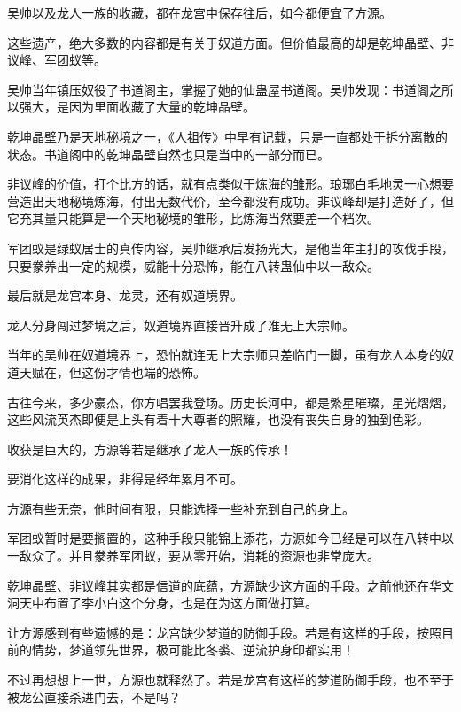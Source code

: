 \begin{this_body}
吴帅以及龙人一族的收藏，都在龙宫中保存往后，如今都便宜了方源。

这些遗产，绝大多数的内容都是有关于奴道方面。但价值最高的却是乾坤晶壁、非议峰、军团蚁等。

吴帅当年镇压奴役了书道阁主，掌握了她的仙蛊屋书道阁。吴帅发现：书道阁之所以强大，是因为里面收藏了大量的乾坤晶壁。

乾坤晶壁乃是天地秘境之一，《人祖传》中早有记载，只是一直都处于拆分离散的状态。书道阁中的乾坤晶壁自然也只是当中的一部分而已。

非议峰的价值，打个比方的话，就有点类似于炼海的雏形。琅琊白毛地灵一心想要营造出天地秘境炼海，付出无数代价，至今都没有成功。非议峰却是打造好了，但它充其量只能算是一个天地秘境的雏形，比炼海当然要差一个档次。

军团蚁是绿蚁居士的真传内容，吴帅继承后发扬光大，是他当年主打的攻伐手段，只要豢养出一定的规模，威能十分恐怖，能在八转蛊仙中以一敌众。

最后就是龙宫本身、龙灵，还有奴道境界。

龙人分身闯过梦境之后，奴道境界直接晋升成了准无上大宗师。

当年的吴帅在奴道境界上，恐怕就连无上大宗师只差临门一脚，虽有龙人本身的奴道天赋在，但这份才情也端的恐怖。

古往今来，多少豪杰，你方唱罢我登场。历史长河中，都是繁星璀璨，星光熠熠，这些风流英杰即便是上头有着十大尊者的照耀，也没有丧失自身的独到色彩。

收获是巨大的，方源等若是继承了龙人一族的传承！

要消化这样的成果，非得是经年累月不可。

方源有些无奈，他时间有限，只能选择一些补充到自己的身上。

军团蚁暂时是要搁置的，这种手段只能锦上添花，方源如今已经是可以在八转中以一敌众了。并且豢养军团蚁，要从零开始，消耗的资源也非常庞大。

乾坤晶壁、非议峰其实都是信道的底蕴，方源缺少这方面的手段。之前他还在华文洞天中布置了李小白这个分身，也是在为这方面做打算。

让方源感到有些遗憾的是：龙宫缺少梦道的防御手段。若是有这样的手段，按照目前的情势，梦道领先世界，极可能比冬裘、逆流护身印都实用！

不过再想想上一世，方源也就释然了。若是龙宫有这样的梦道防御手段，也不至于被龙公直接杀进门去，不是吗？

\end{this_body}

